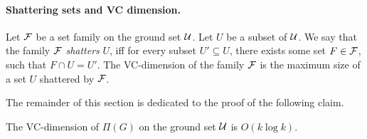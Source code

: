 \paragraph{Shattering sets and VC dimension.} Let ${\mathcal{F}}$ be a set family on the ground set ${\mathcal U}$.
Let $U$ be a subset of ${\mathcal U}$. We say that the family ${\mathcal{F}}$ \emph{shatters} $U$, iff for every subset $U'\subseteq U$, there exists some set $F\in {\mathcal{F}}$, such that $F\cap U=U'$. The VC-dimension of the family ${\mathcal{F}}$ is the maximum size of a set $U$ shattered by ${\mathcal{F}}$.

The remainder of this section is dedicated to the proof of the following claim.

\begin{claim}
\label{clm: VC-dim}
The VC-dimension of $\Pi(G)$ on the ground set ${\mathcal U}$ is $O(k \log k)$.
\end{claim}
